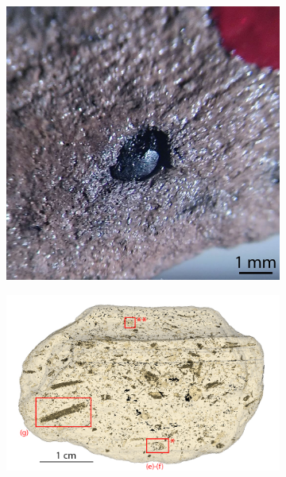 \documentclass[preprint,10pt,oneside,onecolumn,authoryear]{elsarticle}
\begin{document}
\begin{figure}[!p]
\begin{subfigure}[t]{.235\textwidth}
		\includegraphics[width=\textwidth]{Fig_microCT_IMG_20211108_132303.jpg}
		\caption{}
		\label{fig:waf83/16-3:33_detail}
	\end{subfigure}\hfill
	\begin{subfigure}[t]{\textwidth}
		\includegraphics[width=\textwidth]{Fig_microCT_Screenshot_1.jpg}
		\caption{\vspace{1em}}

\end{subfigure}
\end{figure}
\end{document}
